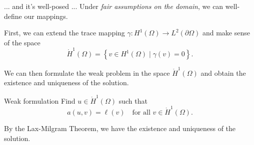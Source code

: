 \documentclass{beamer}
\begin{document}
\begin{frame}{... and it's well-posed ...}
    Under \emph{fair assumptions on the domain}, we can well-define our mappings.

    \pause

    First, we can extend the trace mapping \(\gamma: H^1(\Omega) \to L^2(\partial \Omega)\) and make sense of the space
    \begin{equation*}
        \mathring{H}^1(\Omega) = \left\{ v \in H^1(\Omega) \mid \gamma(v) = 0 \right\}.
    \end{equation*}

    \pause

    We can then formulate the weak problem in the space \(\mathring{H}^1(\Omega)\) and obtain the existence and uniqueness of the solution.

    \begin{block}{Weak formulation}
        Find \(u \in \mathring{H}^1(\Omega)\) such that
        \begin{equation}
            a(u,v) = \ell(v) \quad \text{for all } v \in \mathring{H}^1(\Omega).
        \end{equation}
    \end{block}

    By the Lax-Milgram Theorem, we have the existence and uniqueness of the solution.
\end{frame}
\end{document}
